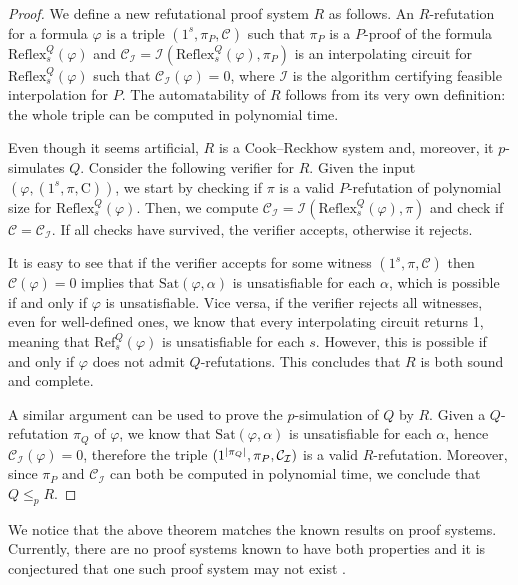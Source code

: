 \begin{proof}
    We define a new refutational proof system $R$ as follows. An $R$-refutation for a formula $\varphi$ is a triple $(1^s, \pi_P, \mathcal{C})$ such that $\pi_P$ is a $P$-proof of the formula $\mathrm{Reflex}_s^Q(\varphi)$ and $\mathcal{C}_{\mathcal{I}} = \mathcal{I}(\mathrm{Reflex}_s^Q(\varphi), \pi_P)$ is an interpolating circuit for $\mathrm{Reflex}_s^Q(\varphi)$ such that $\mathcal{C}_{\mathcal{I}}(\varphi) = 0$, where $\mathcal{I}$ is the algorithm certifying feasible interpolation for $P$. The automatability of $R$ follows from its very own definition: the whole triple can be computed in polynomial time.

    Even though it seems artificial, $R$ is a Cook--Reckhow system and, moreover, it $p$-simulates $Q$. Consider the following verifier for $R$. Given the input $(\varphi, (1^s, \pi, \mathrm{C}))$, we start by checking if $\pi$ is a valid $P$-refutation of polynomial size for $\mathrm{Reflex}_s^Q(\varphi)$. Then, we compute $\mathcal{C}_{\mathcal{I}} = \mathcal{I}(\mathrm{Reflex}_s^Q(\varphi), \pi)$ and check if $\mathcal{C} = \mathcal{C}_{\mathcal{I}}$. If all checks have survived, the verifier accepts, otherwise it rejects.

    It is easy to see that if the verifier accepts for some witness $(1^s, \pi, \mathcal{C})$ then $\mathcal{C}(\varphi) = 0$ implies that $\mathrm{Sat}(\varphi, \alpha)$ is unsatisfiable for each $\alpha$, which is possible if and only if $\varphi$ is unsatisfiable. Vice versa, if the verifier rejects all witnesses, even for well-defined ones, we know that every interpolating circuit returns 1, meaning that $\mathrm{Ref}_s^Q(\varphi)$ is unsatisfiable for each $s$. However, this is possible if and only if $\varphi$ does not admit $Q$-refutations. This concludes that $R$ is both sound and complete.

    A similar argument can be used to prove the $p$-simulation of $Q$ by $R$. Given a $Q$-refutation $\pi_Q$ of $\varphi$, we know that $\mathrm{Sat}(\varphi, \alpha)$ is unsatisfiable for each $\alpha$, hence $\mathcal{C}_{\mathcal{I}}(\varphi) = 0$, therefore the triple $(1^{\left|\pi_Q\right|}, \pi_P, \mathcal{C}_{\mathcal{I}})$ is a valid $R$-refutation. Moreover, since $\pi_P$ and $\mathcal{C}_{\mathcal{I}}$ can both be computed in polynomial time, we conclude that $Q \leq_p R$.
\end{proof}

We notice that the above theorem matches the known results on proof systems. Currently, there are no proof systems known to have both properties and it is conjectured that one such proof system may not exist \cite{pudlak_upper}. 

